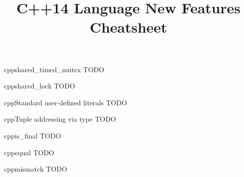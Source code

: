 \documentclass[10pt,a4paper]{article}
\title{\color{w3schools}C++14 Language New Features Cheatsheet
}
\begin{document}
\maketitle
\small
\begin{multicols}{3}

\thispagestyle{empty}
\scriptsize

% 




\begin{codebox}{cpp}{shared\_timed\_mutex}
TODO

\end{codebox}

\begin{codebox}{cpp}{shared\_lock}
TODO

\end{codebox}

\begin{codebox}{cpp}{Standard user-defined literals}
TODO

\end{codebox}

\begin{codebox}{cpp}{Tuple addressing via type}
TODO

\end{codebox}

\begin{codebox}{cpp}{is\_final}
TODO

\end{codebox}

\begin{codebox}{cpp}{equal}
TODO

\end{codebox}

\begin{codebox}{cpp}{mismatch}
TODO


\end{codebox}
\end{multicols}
\end{document}
